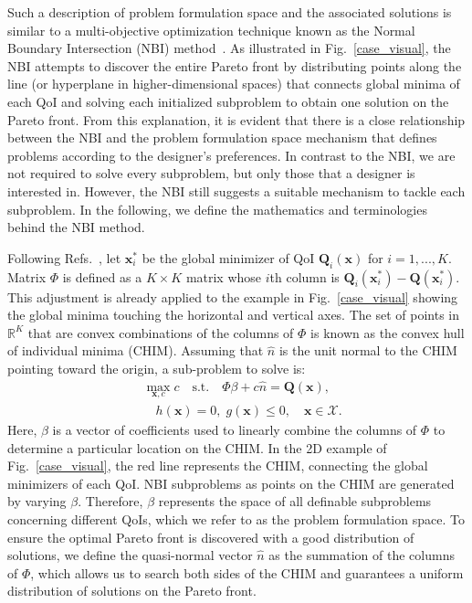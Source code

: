 \documentclass[final,5p,times,twocolumn]{elsarticle}
\begin{document}
Such a description of problem formulation space and the associated solutions is similar to a multi-objective optimization technique known as the Normal Boundary Intersection (NBI) method~\cite{das1997nonlinear,doi:10.1137/S1052623496307510}. As illustrated in Fig.~\ref{case_visual}, the NBI attempts to discover the entire Pareto front by distributing points along the line (or hyperplane in higher-dimensional spaces) that connects global minima of each QoI and solving each initialized subproblem to obtain one solution on the Pareto front. From this explanation, it is evident that there is a close relationship between the NBI and the problem formulation space mechanism that defines problems according to the designer's preferences. In contrast to the NBI, we are not required to solve every subproblem, but only those that a designer is interested in. However, the NBI still suggests a suitable mechanism to tackle each subproblem. In the following, we define the mathematics and terminologies behind the NBI method.

Following Refs.~\cite{das1997nonlinear,doi:10.1137/S1052623496307510}, let $\textbf{x}_i^*$ be the global minimizer of QoI $\mathbf{Q}_i (\textbf{x})$ for $i=1,...,K$. Matrix $\Phi$ is defined as a $K \times K$ matrix whose $i$th column is $\mathbf{Q}_i (\textbf{x}_i^*) - \mathbf{Q} (\textbf{x}_i^*)$. This adjustment is already applied to the example in Fig.~\ref{case_visual} showing the global minima touching the horizontal and vertical axes.
The set of points in $\mathbb{R}^K$ that are convex combinations of the columns of $\Phi$ is known as the convex hull of individual minima (CHIM). Assuming that $\hat{n}$ is the unit normal to the CHIM pointing toward the origin, a sub-problem to solve is:
\begin{equation}
\label{sub}
\begin{aligned}
   &\max_{\textbf{x},c} c\quad
    \textrm{s.t.}\quad \Phi \beta + c\hat{n} = \mathbf{Q}(\textbf{x}),\\
    &\quad h(\textbf{x})=0,\;g(\textbf{x})\leq0,\quad \textbf{x} \in \mathcal{X}.
\end{aligned}
\end{equation}
Here, $\beta$ is a vector of coefficients used to linearly combine the columns of $\Phi$ to determine a particular location on the CHIM. In the 2D example of Fig.~\ref{case_visual}, the red line represents the CHIM, connecting the global minimizers of each QoI. NBI subproblems as points on the CHIM are generated by varying $\beta$. Therefore, $\beta$ represents the space of all definable subproblems concerning different QoIs, which we refer to as the problem formulation space. To ensure the optimal Pareto front is discovered with a good distribution of solutions, we define the quasi-normal vector $\hat{n}$ as the summation of the columns of $\Phi$, which allows us to search both sides of the CHIM and guarantees a uniform distribution of solutions on the Pareto front.
\end{document}
